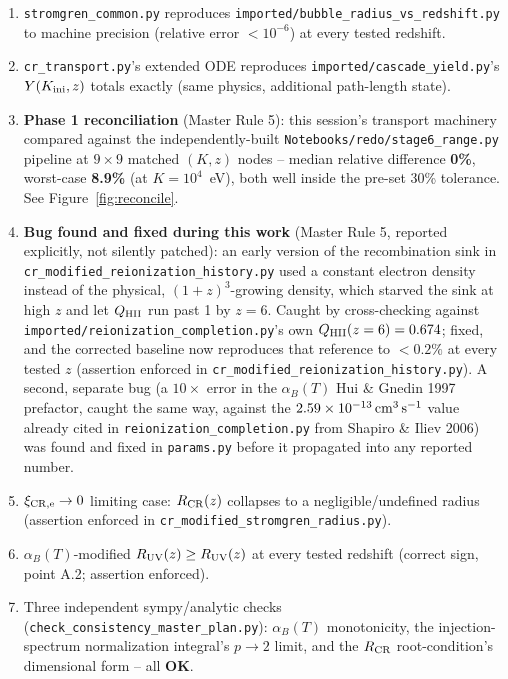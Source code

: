 \documentclass[11pt,a4paper]{article}
\newcommand{\Kini}{K_{\rm ini}}
\begin{document}
\begin{enumerate}
\item \texttt{stromgren\_common.py} reproduces \texttt{imported/bubble\_radius\_vs\_redshift.py}
      to machine precision (relative error $<10^{-6}$) at every tested redshift.
\item \texttt{cr\_transport.py}'s extended ODE reproduces \texttt{imported/cascade\_yield.py}'s
      $Y(\Kini,z)$ totals exactly (same physics, additional path-length state).
\item \textbf{Phase 1 reconciliation} (Master Rule 5): this session's transport machinery
      compared against the independently-built \texttt{Notebooks/redo/stage6\_range.py}
      pipeline at $9\times9$ matched $(K,z)$ nodes -- median relative difference
      \textbf{0\%}, worst-case \textbf{8.9\%} (at $K=10^4$~eV), both well inside the pre-set
      30\% tolerance. See Figure~\ref{fig:reconcile}.
\item \textbf{Bug found and fixed during this work} (Master Rule 5, reported explicitly, not
      silently patched): an early version of the recombination sink in
      \texttt{cr\_modified\_reionization\_history.py} used a constant electron density instead
      of the physical, $(1+z)^3$-growing density, which starved the sink at high $z$ and let
      $Q_{\rm HII}$ run past 1 by $z=6$. Caught by cross-checking against
      \texttt{imported/reionization\_completion.py}'s own $Q_{\rm HII}(z=6)=0.674$; fixed, and
      the corrected baseline now reproduces that reference to $<0.2\%$ at every tested $z$
      (assertion enforced in \texttt{cr\_modified\_reionization\_history.py}). A second,
      separate bug (a $10\times$ error in the $\alpha_B(T)$ Hui \& Gnedin 1997 prefactor,
      caught the same way, against the $2.59\times10^{-13}\,{\rm cm^3\,s^{-1}}$ value already
      cited in \texttt{reionization\_completion.py} from Shapiro \& Iliev 2006) was found and
      fixed in \texttt{params.py} before it propagated into any reported number.
\item $\xi_{\rm CR,e}\to0$ limiting case: $R_{\rm CR}(z)$ collapses to a negligible/undefined
      radius (assertion enforced in \texttt{cr\_modified\_stromgren\_radius.py}).
\item $\alpha_B(T)$-modified $R_{\rm UV}(z)\ge R_{\rm UV}(z)$ at every tested redshift
      (correct sign, point A.2; assertion enforced).
\item Three independent sympy/analytic checks (\texttt{check\_consistency\_master\_plan.py}):
      $\alpha_B(T)$ monotonicity, the injection-spectrum normalization integral's $p\to2$
      limit, and the $R_{\rm CR}$ root-condition's dimensional form -- all \textbf{OK}.
\end{enumerate}
\end{document}
